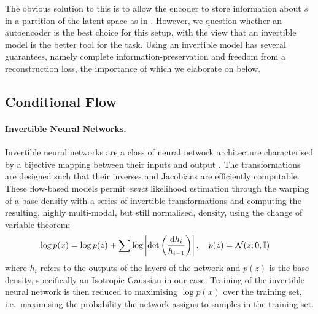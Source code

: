The obvious solution to this is to allow the encoder to store information about $s$ in a partition of the latent space as in  \citet{creager2019flexibly}.  However, we question whether an autoencoder is the best choice for this setup, with the view that an invertible model is the better tool for the task. Using an invertible model has several guarantees, namely complete information-preservation and freedom from a reconstruction loss, the importance of which we elaborate on below.

\subsection{Conditional Flow}\label{cflow}
\paragraph{Invertible Neural Networks.}
Invertible neural networks are a class of neural network architecture characterised by a bijective mapping between their inputs and output \citep{Dinh2014}. The transformations are designed such that their inverses and Jacobians are efficiently computable.
These flow-based models permit \emph{exact} likelihood estimation \citep{normflows2015} through the warping of a base density with a series of invertible transformations and computing the resulting, highly multi-modal, but still normalised, density, using the change of variable theorem:
\begin{align}
\begin{split}
  \log p(x) &= \log p(z) + 
   \sum \log \left| \det\left( \frac{\diff h_i}{ h_{i-1}}\right) \right|, %
  \quad p(z) = \mathcal{N}(z; 0, \mathbb{I})
  \label{eq:changeofvariables}
\end{split}
\end{align}
where $h_i$ refers to the outputs of the layers of the network and $p(z)$ is the base density, specifically an Isotropic Gaussian in our case.
Training of the invertible neural network is then reduced to maximising $\log p(x)$ over the training set,
i.e.\ maximising the probability the network assigns to samples in the training set.


